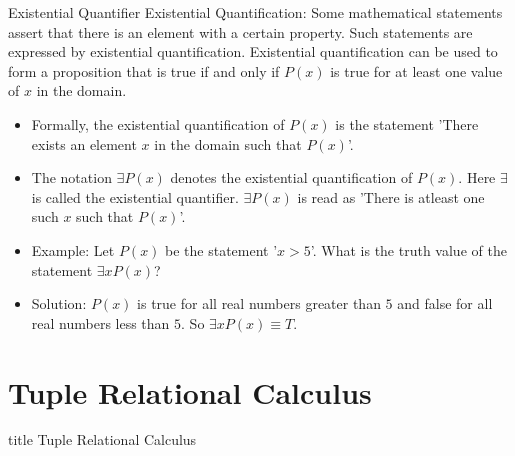 \documentclass[aspectratio=169, xcolor=dvipsnames]{beamer}
\begin{document}
\begin{frame}{Existential Quantifier}
    Existential Quantification: Some mathematical statements assert that there is an element with a certain property. Such statements are expressed by existential quantification. Existential quantification can be used to form a proposition that is true if and only if $P(x)$ is true for at least one value of $x$ in the domain.
    \begin{itemize}[<+->]
        \item Formally, the existential quantification of $P(x)$ is the statement 'There exists an element $x$ in the domain such that $P(x)$'.
        \item The notation $\exists P(x)$ denotes the existential quantification of $P(x)$. Here $\exists$ is called the existential quantifier. $\exists P(x)$ is read as 'There is atleast one such $x$ such that $P(x)$'.
        \item Example: Let $P(x)$ be the statement '$x > 5$'. What is the truth value of the statement $\exists x P(x)$?
        \item Solution: $P(x)$ is true for all real numbers greater than $5$ and false for all real numbers less than $5$. So $\exists x P(x) \equiv T$.
    \end{itemize}
\end{frame}

\section{Tuple Relational Calculus}
\begin{frame}
  \vfill
  \centering
  \begin{beamercolorbox}[sep=8pt,center,shadow=true,rounded=true]{title}
    Tuple Relational Calculus\par%
  \end{beamercolorbox}
  \vfill
\end{frame}
\end{document}
